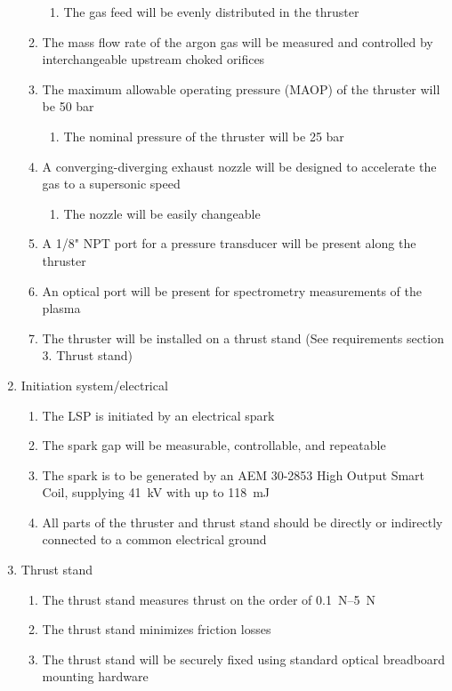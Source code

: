 \begin{enumerate}
\begin{enumerate}
\begin{enumerate}
                        \item The gas feed will be evenly distributed in the thruster
                    \end{enumerate}
                    \item The mass flow rate of the argon gas will be measured and controlled by interchangeable upstream choked orifices
                    \item The maximum allowable operating pressure (MAOP) of the thruster will be 50 bar
                    \begin{enumerate}
                        \item The nominal pressure of the thruster will be 25 bar
                    \end{enumerate}
                    \item A converging-diverging exhaust nozzle will be designed to accelerate the gas to a supersonic speed
                    \begin{enumerate}
                        \item The nozzle will be easily changeable
                    \end{enumerate}
                    \item A 1/8" NPT port for a pressure transducer will be present along the thruster
                    \item An optical port will be present for spectrometry measurements of the plasma
                    \item The thruster will be installed on a thrust stand (See requirements section 3. Thrust stand)
                \end{enumerate}
                \item Initiation system/electrical
                \begin{enumerate}
                    \item The LSP is initiated by an electrical spark
                    \item The spark gap will be measurable, controllable, and repeatable
                    \item The spark is to be generated by an AEM 30-2853 High Output Smart Coil, supplying \qty{41}{kV} with up to \qty{118}{mJ}
                    \item All parts of the thruster and thrust stand should be directly or indirectly connected to a common electrical ground
                \end{enumerate}
                \item Thrust stand
                \begin{enumerate}
                    \item The thrust stand measures thrust on the order of \qtyrange{0.1}{5}{N}
                    \item The thrust stand minimizes friction losses
                    \item The thrust stand will be securely fixed using standard optical breadboard mounting hardware
                \end{enumerate}
            \end{enumerate}

